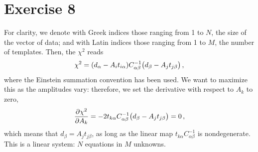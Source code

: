 \documentclass[main.tex]{subfiles}
\begin{document}
\section*{Exercise 8}

For clarity, we denote with Greek indices those ranging from 1 to \(N\), the size of the vector of data; and with Latin indices those ranging from 1 to \(M\), the number of templates. 
Then, the \(\chi^2\) reads 
%
\begin{align}
\chi^2 = \qty(d_\alpha - A_{i} t_{i \alpha }) C^{-1}_{\alpha \beta } 
\qty(d_\beta - A_j t_{j \beta })
\,,
\end{align}
%
where the Einstein summation convention has been used. 
We want to maximize this as the amplitudes vary: therefore, we set the derivative with respect to \(A_k\) to zero,
%
\begin{align}
\pdv{\chi^2}{A_k} = -2 t_{k \alpha } C^{-1}_{\alpha \beta } \qty(d_\beta - A_j t_{j \beta }) = 0
\,,
\end{align}
%
which means that \(d_ \beta = A_j t_{j \beta }\), as long as the linear map \(t_{k \alpha } C^{-1}_{\alpha \beta }\) is nondegenerate. This is a linear system: \(N\) equations in \(M\) unknowns.

\end{document}
